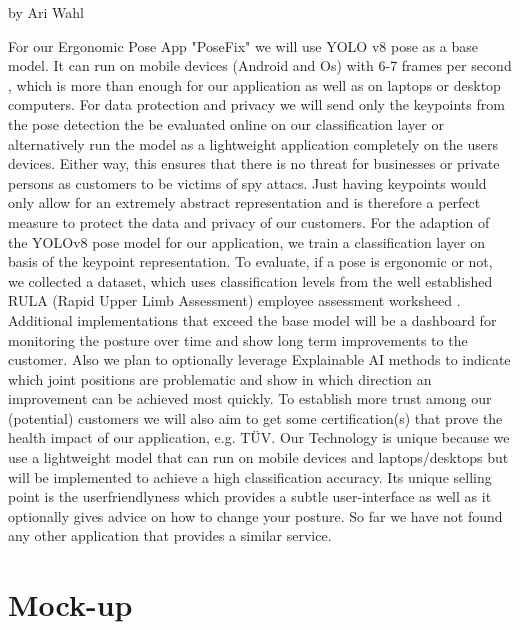 by Ari Wahl

For our Ergonomic Pose App "PoseFix" we will use YOLO v8 pose as a base model. 
It can run on mobile devices (Android and Os) with 6-7 frames per second \cite{ultralytics2022}, 
which is more than enough for our application as well as on laptops or desktop computers. For data protection and privacy we will send only the keypoints from the pose detection 
the be evaluated online on our classification layer or alternatively run the model as a lightweight application completely on the users devices. 
Either way, this ensures that there is no threat for businesses or private persons as customers to be victims of spy attacs. Just having keypoints 
would only allow for an extremely abstract representation and is therefore a perfect measure to protect the data and privacy of our customers. 
For the adaption of the YOLOv8 pose model for our application, we train a classification layer on basis of the keypoint representation. 
To evaluate, if a pose is ergonomic or not, we collected a dataset, which uses classification levels from the well established RULA (Rapid Upper Limb Assessment) employee assessment 
worksheed \cite{Holzgreve_2022}. 
Additional implementations that exceed the base model will be a dashboard for monitoring the posture over time and show long term improvements 
to the customer. Also we plan to optionally leverage Explainable AI methods to indicate which joint positions are problematic and show
 in which direction an improvement can be achieved most quickly. To establish more trust among our (potential) customers 
 we will also aim to get some certification(s) that prove the health impact of our application, e.g. TÜV. 
Our Technology is unique because we use a lightweight model that can run on mobile devices and laptops/desktops but will be implemented to achieve a high classification accuracy.
Its unique selling point is the userfriendlyness which provides a subtle user-interface as well as it optionally gives advice on how to change your posture.
So far we have not found any other application that provides a similar service.

\section{Mock-up}

